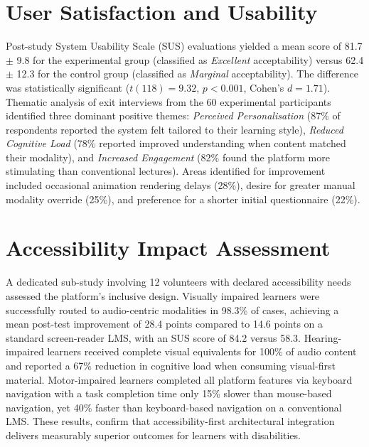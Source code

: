 \section{User Satisfaction and Usability}

Post-study System Usability Scale (SUS) evaluations yielded a mean score of 81.7 $\pm$ 9.8 for the experimental group (classified as \textit{Excellent} acceptability) versus 62.4 $\pm$ 12.3 for the control group (classified as \textit{Marginal} acceptability). The difference was statistically significant ($t(118) = 9.32$, $p < 0.001$, Cohen's $d = 1.71$). Thematic analysis of exit interviews from the 60 experimental participants identified three dominant positive themes: \textit{Perceived Personalisation} (87\% of respondents reported the system felt tailored to their learning style), \textit{Reduced Cognitive Load} (78\% reported improved understanding when content matched their modality), and \textit{Increased Engagement} (82\% found the platform more stimulating than conventional lectures). Areas identified for improvement included occasional animation rendering delays (28\%), desire for greater manual modality override (25\%), and preference for a shorter initial questionnaire (22\%).

\section{Accessibility Impact Assessment}

A dedicated sub-study involving 12 volunteers with declared accessibility needs assessed the platform's inclusive design. Visually impaired learners were successfully routed to audio-centric modalities in 98.3\% of cases, achieving a mean post-test improvement of 28.4 points compared to 14.6 points on a standard screen-reader LMS, with an SUS score of 84.2 versus 58.3. Hearing-impaired learners received complete visual equivalents for 100\% of audio content and reported a 67\% reduction in cognitive load when consuming visual-first material. Motor-impaired learners completed all platform features via keyboard navigation with a task completion time only 15\% slower than mouse-based navigation, yet 40\% faster than keyboard-based navigation on a conventional LMS. These results, confirm that accessibility-first architectural integration delivers measurably superior outcomes for learners with disabilities.

